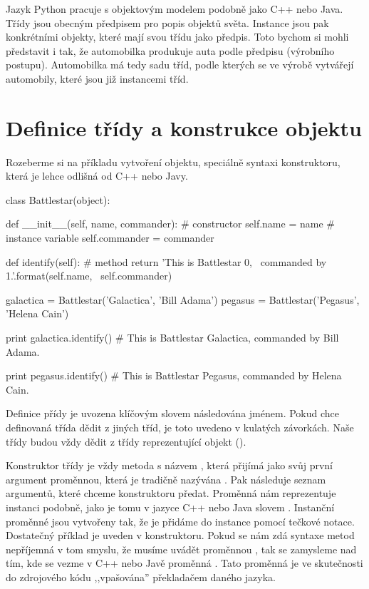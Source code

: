 Jazyk Python pracuje s objektovým modelem podobně jako C++ nebo Java. Třídy jsou obecným předpisem pro
popis objektů světa. Instance jsou pak konkrétními objekty, které mají svou třídu jako předpis.
Toto bychom si mohli představit i tak, že automobilka produkuje auta podle předpisu (výrobního postupu).
Automobilka má tedy sadu tříd, podle kterých se ve výrobě vytvářejí automobily, které jsou již instancemi
tříd.


\section{Definice třídy a konstrukce objektu}

Rozeberme si na příkladu vytvoření objektu, speciálně syntaxi konstruktoru, která je lehce odlišná
od C++ nebo Javy.

\begin{python}
class Battlestar(object):
    
    def __init__(self, name, commander): # constructor
        self.name = name                 # instance variable
        self.commander = commander

    def identify(self):                  # method
        return 'This is Battlestar {0}, \
                commanded by {1}.'.format(self.name, \
                self.commander)

galactica = Battlestar('Galactica', 'Bill Adama')
pegasus = Battlestar('Pegasus', 'Helena Cain')

print galactica.identify()
# This is Battlestar Galactica, commanded by Bill Adama.

print pegasus.identify()
# This is Battlestar Pegasus, commanded by Helena Cain.
\end{python}

    Definice přídy je uvozena klíčovým slovem  následována jménem.
Pokud chce definovaná třída
dědit z jiných tříd, je toto uvedeno v kulatých závorkách. Naše třídy budou vždy dědit z třídy reprezentující
objekt (\kod{object}).

Konstruktor třídy je vždy metoda s názvem ,
která přijímá jako svůj první argument proměnnou,
která je tradičně nazývána \index{self}.
Pak následuje seznam argumentů, které chceme konstruktoru předat.
Proměnná \kod{self} nám reprezentuje instanci podobně, jako je tomu v jazyce C++ nebo Java slovem .
Instanční proměnné jsou vytvořeny tak, že je přidáme do instance pomocí tečkové notace. Dostatečný příklad
je uveden v konstruktoru.
Pokud se nám zdá syntaxe metod nepříjemná v tom smyslu, že musíme uvádět proměnnou \kod{self}, tak se
zamysleme nad tím, kde se vezme v C++ nebo Javě proměnná . Tato proměnná je ve skutečnosti
do zdrojového kódu ,,vpašována'' překladačem daného jazyka.

